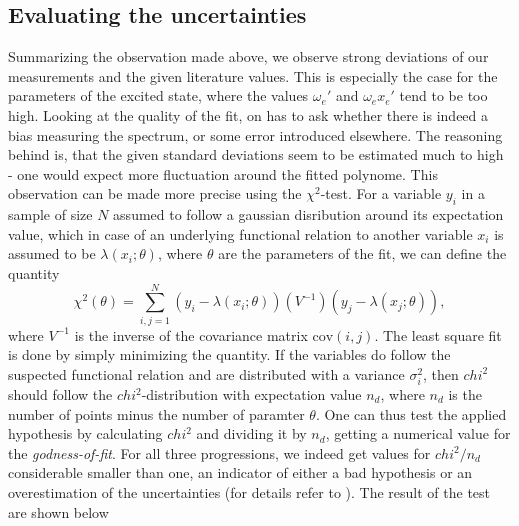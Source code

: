 \subsection{Evaluating the uncertainties}
Summarizing the observation made above, we observe strong deviations 
of our measurements and the given literature values. This is especially 
the case for the parameters of the excited state, where the values 
$\omega_e'$ and $\omega_e x_e'$ tend to be too high. Looking 
at the quality of the fit, on has to ask whether there is indeed 
a bias measuring the spectrum, or some error introduced elsewhere. 
The reasoning behind is, that the given standard deviations 
seem to be estimated much to high - one would expect more fluctuation 
around the fitted polynome. This observation can be made more 
precise using the $\chi^2$-test. For a variable $y_i$ in a sample of 
size $N$ assumed to follow 
a gaussian disribution around its expectation value, which in case of 
an underlying functional relation to another variable $x_i$ is assumed 
to be $\lambda(x_i; \theta)$, where $\theta$ are the parameters of 
the fit, we can define the quantity
\begin{equation}
    \chi^2(\theta) = \sum_{i, j= 1}^N (y_i - \lambda(x_i; \theta))
        (V^{-1}) (y_j - \lambda(x_j; \theta)), 
\end{equation}
where $V^{-1}$ is the inverse of the covariance matrix $\mathrm{cov}(i,j)$. 
The least square fit is done by simply minimizing the quantity. If the 
variables do follow the suspected functional relation and are distributed 
with a variance $\sigma_i^2$, then $chi^2$ should follow the 
$chi^2$-distribution with expectation value $n_d$, where $n_d$ is 
the number of points minus the number of paramter $\theta$.
One can thus test the applied hypothesis by calculating $chi^2$ and 
dividing it by $n_d$, getting a numerical value for the 
\emph{godness-of-fit}. For all three progressions, 
we indeed get values for $chi^2 / n_d$ considerable smaller than one, 
an indicator of either a bad hypothesis or an overestimation 
of the uncertainties (for details refer to \cite{cowan1998statistical}).
The result of the test are shown below
